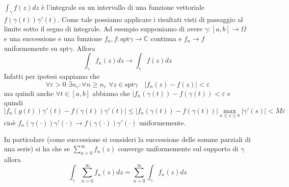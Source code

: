 \begin{remark}
    \(\int_{\gamma} f(z) dz\) è l'integrale su un intervallo di una funzione
    vettoriale \(f{(\gamma{(t)})}\gamma'{(t)}\). Come tale possiamo applicare i
    risultati visti di passaggio al limite sotto il segno di integrale. Ad
    esempio supponiamo di avere \(\gamma : [a,b] \to \Omega\) e una successione
    e una funzione \(f_{n}, f : \text{spt}\gamma \to \mathbb{C}\) continua e
    \(f_{n} \to f\) uniformemente su \(\text{spt}\gamma\). Allora
    \[
        \int_{\gamma} f_{n}(z) dz \to \int_{\gamma} f(z) dz
    \]
    Infatti 
    per ipotesi sappiamo che
    \[
        \forall \varepsilon>0\,\, \exists n_\varepsilon : \forall n \ge
        n_\varepsilon \,\, \forall z \in \text{spt}\gamma \quad |f_{n}(z) -
        f(z)| < \varepsilon
    \]
    ma quindi anche \(\forall t \in [a,b]\) abbiamo che \(|f_{n}{(\gamma{(t)})}
    - f{(\gamma{(t)})} < \varepsilon\) e quindi
    \[
        \left| f_{n}{(g{(t)})}\gamma'{(t)} - f{(\gamma{(t)})}\gamma'{(t)}\right|
        \le |f_{n}{(\gamma{(t)})} - f{(\gamma{(t)})}| \max_{a\le s\le b}
        |\gamma'{(s)}| < M\varepsilon 
    \]
    cioè \(f_{n}{(\gamma{(\cdot )})}\gamma'{(\cdot )} \to f{(\gamma{(\cdot
    )})}\gamma'{(\cdot )}\) uniformemente.

    In particolare (come successione si consideri la successione delle somme
    parziali di una serie) si ha che se \(\sum_{n=0}^{\infty} f_{n}(z) \)
    converge uniformemente sul supporto di \(\gamma\) allora
    \[
        \int_{\gamma} \sum_{n=0}^{\infty} f_{n}(z) dz = \sum_{n=0}^{\infty}
        \int_{\gamma} f_{n}(z) dz
    \]
\end{remark}

